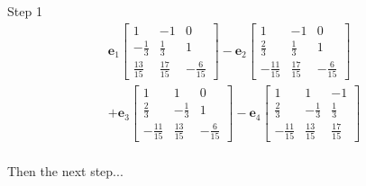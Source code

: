 \documentclass{tufte-book}
\newcommand{\vct}{\mathbf}
\theoremstyle{mytheoremstyle}
\theoremstyle{mylemstyle}
\theoremstyle{mydefstyle}
\begin{document}
Step 1
\begin{multline*}
\vct{e}_1
\begin{bmatrix}
1 & {-1} & 0 \\
-\frac{1}{3} &\frac{1}{3} & 1 \\
\frac{13}{15} &\frac{17}{15} & {-\frac{6}{15}}
\end{bmatrix}
-
\vct{e}_2
\begin{bmatrix}
1 & -1 & 0 \\
\frac{2}{3} &\frac{1}{3} & 1 \\
{-\frac{11}{15}} &\frac{17}{15} & {-\frac{6}{15}}
\end{bmatrix}\\
+\vct{e}_3
\begin{bmatrix}
1 & 1 & 0 \\
\frac{2}{3} & -\frac{1}{3} & 1 \\
{-\frac{11}{15}} & \frac{13}{15} & {-\frac{6}{15}}
\end{bmatrix}
- \vct{e}_4
\begin{bmatrix}
1 & 1 & {-1} \\
\frac{2}{3} & -\frac{1}{3} &\frac{1}{3}\\
{-\frac{11}{15}} & \frac{13}{15} &\frac{17}{15}
\end{bmatrix} \\
\end{multline*}

Then the next step...
\end{document}
